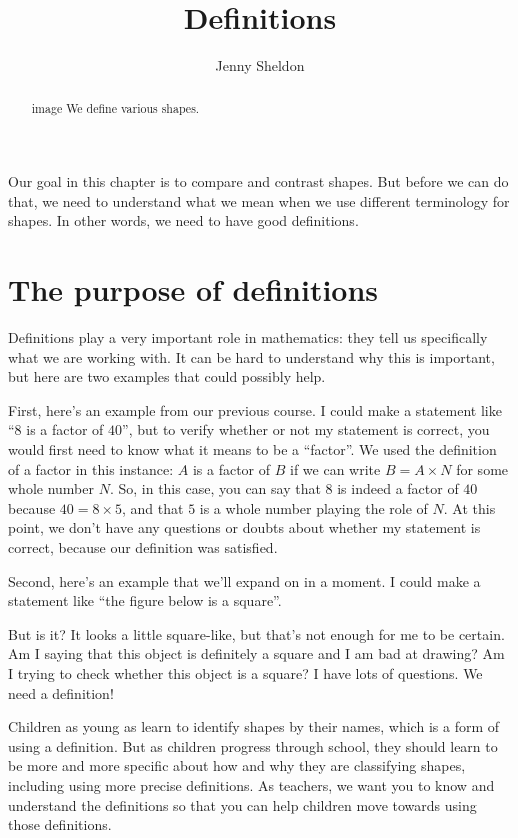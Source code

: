 \documentclass{ximera}
\title{Definitions}
\author{Jenny Sheldon}
\begin{document}
\begin{abstract}image
We define various shapes.
\end{abstract}
\maketitle

Our goal in this chapter is to compare and contrast shapes. But before we can do that, we need to understand what we mean when we use different terminology for shapes. In other words, we need to have good definitions.

\section{The purpose of definitions}

Definitions play a very important role in mathematics: they tell us specifically what we are working with. It can be hard to understand why this is important, but here are two examples that could possibly help.

First, here's an example from our previous course. I could make a statement like ``$8$ is a factor of $40$'', but to verify whether or not my statement is correct, you would first need to know what it means to be a ``factor''. We used the definition of a factor in this instance: $A$ is a factor of $B$ if we can write $B = A \times N$ for some whole number $N$. So, in this case, you can say that $8$ is indeed a factor of $40$ because $40 = 8 \times 5$, and that $5$ is a whole number playing the role of $N$. At this point, we don't have any questions or doubts about whether my statement is correct, because our definition was satisfied.

Second, here's an example that we'll expand on in a moment. I could make a statement like ``the figure below is a square''.
\begin{image}
\end{image}
But is it? It looks a little square-like, but that's not enough for me to be certain. Am I saying that this object is definitely a square and I am bad at drawing? Am I trying to check whether this object is a square? I have lots of questions. We need a definition!

Children as young as  learn to identify shapes by their names, which is a form of using a definition. But as children progress through school, they should learn to be more and more specific about how and why they are classifying shapes, including using more precise definitions. As teachers, we want you to know and understand the definitions so that you can help children move towards using those definitions.
\end{document}
